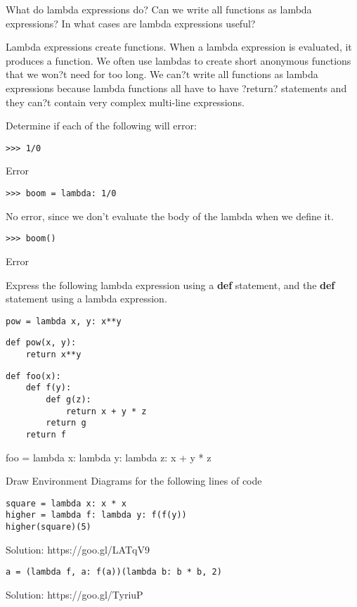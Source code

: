 \question
What do lambda expressions do? Can we write all functions as lambda expressions? In what cases are lambda expressions useful? 
\begin{solution}[0.75in]
Lambda expressions create functions. When a lambda expression is evaluated, it produces a function. We often use lambdas to create short anonymous functions that we won?t need for too long. \newline We can?t write all functions as lambda expressions because lambda functions all have to have ?return? statements and they can?t contain very complex multi-line expressions.
\end{solution}

\question
Determine if each of the following will error: \newline
\begin{lstlisting}
>>> 1/0
\end{lstlisting}
\begin{solution}[0.25in]
Error
\end{solution}
\begin{lstlisting}
>>> boom = lambda: 1/0
\end{lstlisting}
\begin{solution}[0.25in]
No error, since we don't evaluate the body of the lambda when we define it.
\end{solution}
\begin{lstlisting}
>>> boom()
\end{lstlisting}
\begin{solution}[0.25in]
Error
\end{solution}


\question
Express the following lambda expression using a \textbf{def} statement, and the \textbf{def} statement using a lambda expression.
\begin{lstlisting}
pow = lambda x, y: x**y
\end{lstlisting}
\begin{solution}[0.5in]
\begin{verbatim}
def pow(x, y):
    return x**y
\end{verbatim}
\end{solution}

\begin{lstlisting}
def foo(x):
    def f(y):
        def g(z):
            return x + y * z
        return g
    return f
\end{lstlisting}
\begin{solution}[0.25in]
foo = lambda x: lambda y: lambda z: x + y * z
\end{solution}
\newpage
\question 
Draw Environment Diagrams for the following lines of code
\begin{lstlisting}
square = lambda x: x * x
higher = lambda f: lambda y: f(f(y))
higher(square)(5)
\end{lstlisting}
\begin{solution}
Solution: https://goo.gl/LATqV9
\end{solution}

\begin{lstlisting}
a = (lambda f, a: f(a))(lambda b: b * b, 2)
\end{lstlisting}
\begin{solution}
Solution: https://goo.gl/TyriuP
\end{solution}
